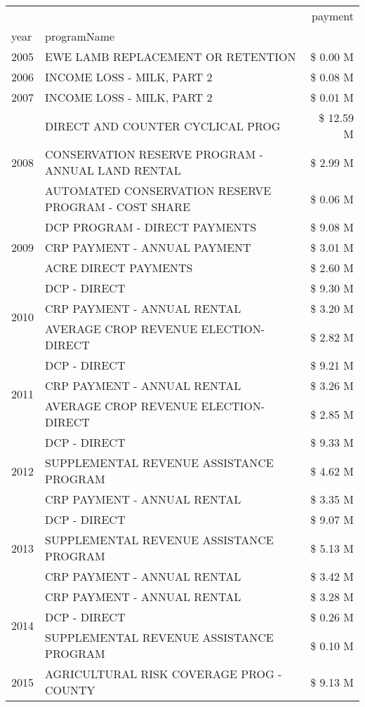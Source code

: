 \begin{tabular}{llr}
\toprule
 &  & payment \\
year & programName &  \\
\midrule
2005 & EWE LAMB REPLACEMENT OR RETENTION & \$ 0.00 M \\
\cline{1-3}
2006 & INCOME LOSS - MILK, PART 2 & \$ 0.08 M \\
\cline{1-3}
2007 & INCOME LOSS - MILK, PART 2 & \$ 0.01 M \\
\cline{1-3}
\multirow[t]{3}{*}{2008} & DIRECT AND COUNTER CYCLICAL PROG & \$ 12.59 M \\
 & CONSERVATION RESERVE PROGRAM - ANNUAL LAND RENTAL & \$ 2.99 M \\
 & AUTOMATED CONSERVATION RESERVE PROGRAM - COST SHARE & \$ 0.06 M \\
\cline{1-3}
\multirow[t]{3}{*}{2009} & DCP PROGRAM - DIRECT PAYMENTS & \$ 9.08 M \\
 & CRP PAYMENT - ANNUAL PAYMENT & \$ 3.01 M \\
 & ACRE DIRECT PAYMENTS & \$ 2.60 M \\
\cline{1-3}
\multirow[t]{3}{*}{2010} & DCP - DIRECT & \$ 9.30 M \\
 & CRP PAYMENT - ANNUAL RENTAL & \$ 3.20 M \\
 & AVERAGE CROP REVENUE ELECTION-DIRECT & \$ 2.82 M \\
\cline{1-3}
\multirow[t]{3}{*}{2011} & DCP - DIRECT & \$ 9.21 M \\
 & CRP PAYMENT - ANNUAL RENTAL & \$ 3.26 M \\
 & AVERAGE CROP REVENUE ELECTION-DIRECT & \$ 2.85 M \\
\cline{1-3}
\multirow[t]{3}{*}{2012} & DCP - DIRECT & \$ 9.33 M \\
 & SUPPLEMENTAL REVENUE ASSISTANCE PROGRAM & \$ 4.62 M \\
 & CRP PAYMENT - ANNUAL RENTAL & \$ 3.35 M \\
\cline{1-3}
\multirow[t]{3}{*}{2013} & DCP - DIRECT & \$ 9.07 M \\
 & SUPPLEMENTAL REVENUE ASSISTANCE PROGRAM & \$ 5.13 M \\
 & CRP PAYMENT - ANNUAL RENTAL & \$ 3.42 M \\
\cline{1-3}
\multirow[t]{3}{*}{2014} & CRP PAYMENT - ANNUAL RENTAL & \$ 3.28 M \\
 & DCP - DIRECT & \$ 0.26 M \\
 & SUPPLEMENTAL REVENUE ASSISTANCE PROGRAM & \$ 0.10 M \\
\cline{1-3}
\multirow[t]{3}{*}{2015} & AGRICULTURAL RISK COVERAGE PROG - COUNTY & \$ 9.13 M \\

\end{tabular}
